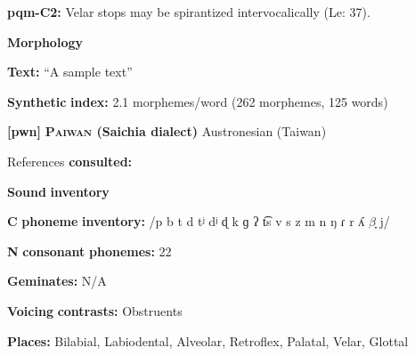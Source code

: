 \documentclass[output=paper]{langsci/langscibook}
\begin{document}
\begin{styleBody}
\textbf{pqm-C2:} Velar stops may be spirantized intervocalically (Le\citealt{Sourd1993}: 37).
\end{styleBody}

\begin{styleBody}
\textbf{Morphology}
\end{styleBody}

\begin{styleBody}
\textbf{Text:} “A sample text” \citep[55-58]{Leavitt1996}
\end{styleBody}

\begin{styleBody}
\textbf{Synthetic} \textbf{index:} 2.1 morphemes/word (262 morphemes, 125 words)
\end{styleBody}

\begin{styleBody}
\textbf{[pwn]}   \textbf{\textsc{Paiwan} \textbf{(Saichia} \textbf{dialect)}}  Austronesian (Taiwan)
\end{styleBody}

\begin{styleBody}
References \textbf{consulted:} \citet{Chang2006}
\end{styleBody}

\begin{styleBody}
\textbf{Sound} \textbf{inventory}
\end{styleBody}

\begin{styleBody}
\textbf{C} \textbf{phoneme} \textbf{inventory:} /p b t d tʲ dʲ ɖ k ɡ ʔ t͡s v s z m n ŋ ɾ r ʎ $\beta ̞$ j/
\end{styleBody}

\begin{styleBody}
\textbf{N} \textbf{consonant} \textbf{phonemes:} 22
\end{styleBody}

\begin{styleBody}
\textbf{Geminates:} N/A
\end{styleBody}

\begin{styleBody}
\textbf{Voicing} \textbf{contrasts:} Obstruents
\end{styleBody}

\begin{styleBody}
\textbf{Places:} Bilabial, Labiodental, Alveolar, Retroflex, Palatal, Velar, Glottal
\end{styleBody}
\end{document}
